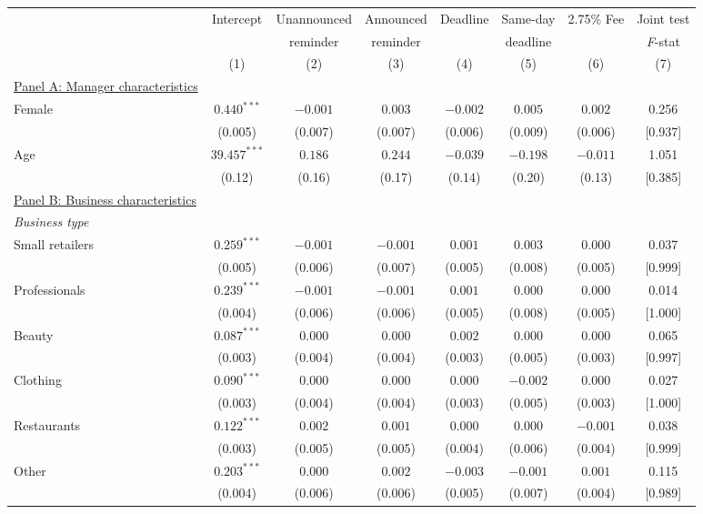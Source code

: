 
\begin{tabular}{lccccccc}
\toprule
 & Intercept & Unannounced & Announced & Deadline & Same-day & 2.75\% Fee & Joint test \\ 
 & & reminder & reminder & & deadline & & \textit{F}-stat \\ 
 & (1) & (2) & (3) & (4) & (5) & (6) & (7)\\ 
 \midrule
\underline{Panel A: Manager characteristics} \\
Female & $0.440^{***}$ & $-0.001$ & $0.003$ & $-0.002$ & $0.005$ & $0.002$ & 0.256\\
 & (0.005) & (0.007) & (0.007) & (0.006) & (0.009) & (0.006) & {}[0.937]\\
Age & $39.457^{***}$ & $0.186$ & $0.244$ & $-0.039$ & $-0.198$ & $-0.011$ & 1.051\\
 & (0.12) & (0.16) & (0.17) & (0.14) & (0.20) & (0.13) & {}[0.385]\\
\underline{Panel B: Business characteristics} \\
\emph{Business type} \\
\quad Small retailers & $0.259^{***}$ & $-0.001$ & $-0.001$ & $0.001$ & $0.003$ & $0.000$ & 0.037\\
 & (0.005) & (0.006) & (0.007) & (0.005) & (0.008) & (0.005) & {}[0.999]\\
\quad Professionals & $0.239^{***}$ & $-0.001$ & $-0.001$ & $0.001$ & $0.000$ & $0.000$ & 0.014\\
 & (0.004) & (0.006) & (0.006) & (0.005) & (0.008) & (0.005) & {}[1.000]\\
\quad Beauty & $0.087^{***}$ & $0.000$ & $0.000$ & $0.002$ & $0.000$ & $0.000$ & 0.065\\
 & (0.003) & (0.004) & (0.004) & (0.003) & (0.005) & (0.003) & {}[0.997]\\
\quad Clothing & $0.090^{***}$ & $0.000$ & $0.000$ & $0.000$ & $-0.002$ & $0.000$ & 0.027\\
 & (0.003) & (0.004) & (0.004) & (0.003) & (0.005) & (0.003) & {}[1.000]\\
\quad Restaurants & $0.122^{***}$ & $0.002$ & $0.001$ & $0.000$ & $0.000$ & $-0.001$ & 0.038\\
 & (0.003) & (0.005) & (0.005) & (0.004) & (0.006) & (0.004) & {}[0.999]\\
\quad Other & $0.203^{***}$ & $0.000$ & $0.002$ & $-0.003$ & $-0.001$ & $0.001$ & 0.115\\
 & (0.004) & (0.006) & (0.006) & (0.005) & (0.007) & (0.004) & {}[0.989]\\

\end{tabular}
